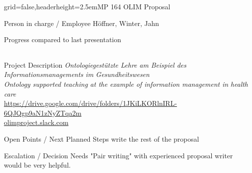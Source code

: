 \documentclass[english]{kiesgrube}
\begin{document}
\begin{poster}{grid=false,headerheight=2.5em}{}{MP 164 OLIM Proposal}{}{}
\begin{posterbox}[name=person,column=0,row=0]{Person in charge / Employee}
Höffner, Winter, Jahn
\end{posterbox}
\begin{posterbox}[name=progress,below=person]{Progress compared to last presentation}
\begin{tabulary}{\textwidth}{lL}
\end{tabulary}
\end{posterbox}
\begin{posterbox}[name=description,column=1,row=0]{Project Description}
\emph{Ontologiegestützte Lehre am Beispiel des Informationsmanagements im Gesundheitswesen}\\
\emph{Ontology supported teaching at the example of information management in health care}\\
\url{https://drive.google.com/drive/folders/1JKiLKORlnIRL-6QJQgp9aN1zNyZTqa2m}\\
\url{olimproject.slack.com}
\end{posterbox}
\begin{posterbox}[name=open,column=1,below=description]{Open Points / Next Planned Steps}
write the rest of the proposal
\end{posterbox}
\begin{posterbox}[name=escalation,column=1,below=open]{Escalation / Decision Needs}
"Pair writing" with experienced proposal writer would be very helpful.
\end{posterbox}

\end{poster}
\end{document}
